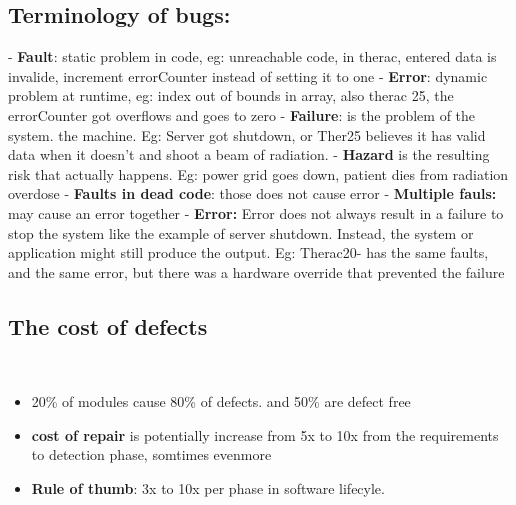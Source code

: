 \documentclass{article}
\begin{document}
\subsection{Terminology of bugs:}
- \textbf{Fault}: static problem in code, eg: unreachable code, in therac,
entered data is invalide, increment errorCounter instead of setting it to one
- \textbf{Error}: dynamic problem at runtime, eg: index out of bounds in array,
also therac 25, the errorCounter got overflows and goes to zero
- \textbf{Failure}: is the problem of the system. the machine. Eg: Server
got shutdown, or Ther25 believes it has valid data when it doesn't and shoot a
beam of radiation.
- \textbf{Hazard} is the resulting risk that actually happens. Eg: power grid
goes down, patient dies from radiation overdose
- \textbf{Faults in dead code}: those does not cause error
- \textbf{Multiple fauls:} may cause an error together
- \textbf{ Error:} Error does not always result in a failure to stop the system
like the example of server shutdown. Instead, the system or application might
still produce the output. Eg: Therac20- has the same faults, and the same error,
but there was a hardware override that prevented the failure

\subsection{The cost of defects}\
\begin{itemize} 
  \item 20\% of modules cause 80\% of defects. and 50\% are defect free
  \item \textbf{cost of repair} is potentially increase from 5x to 10x from the
  requirements to detection phase, somtimes evenmore
  \item \textbf{Rule of thumb}: 3x to 10x per phase in software lifecyle. 
\end{itemize}
 
\end{document}
